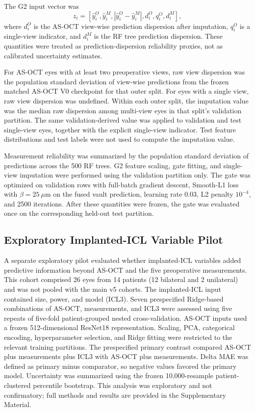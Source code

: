 \documentclass[10pt,twocolumn]{article}
\begin{document}
The G2 input vector was
\begin{equation}
z_i=[
\hat{y}_i^{O},
\hat{y}_i^{M},
|\hat{y}_i^{O}-\hat{y}_i^{M}|,
d_i^{O},
q_i^{O},
d_i^{M}
],
\end{equation}
where $d_i^{O}$ is the AS-OCT view-wise prediction dispersion after imputation, $q_i^{O}$ is a single-view indicator, and $d_i^{M}$ is the RF tree prediction dispersion. These quantities were treated as prediction-dispersion reliability proxies, not as calibrated uncertainty estimates.

For AS-OCT eyes with at least two preoperative views, raw view dispersion was the population standard deviation of view-wise predictions from the frozen matched AS-OCT V0 checkpoint for that outer split. For eyes with a single view, raw view dispersion was undefined. Within each outer split, the imputation value was the median raw dispersion among multi-view eyes in that split's validation partition. The same validation-derived value was applied to validation and test single-view eyes, together with the explicit single-view indicator. Test feature distributions and test labels were not used to compute the imputation value.

Measurement reliability was summarized by the population standard deviation of predictions across the 500 RF trees. G2 feature scaling, gate fitting, and single-view imputation were performed using the validation partition only. The gate was optimized on validation rows with full-batch gradient descent, Smooth-L1 loss with $\beta=25~\mu$m on the fused vault prediction, learning rate 0.03, L2 penalty $10^{-4}$, and 2500 iterations. After these quantities were frozen, the gate was evaluated once on the corresponding held-out test partition.

\subsection{Exploratory Implanted-ICL Variable Pilot}

A separate exploratory pilot evaluated whether implanted-ICL variables added predictive information beyond AS-OCT and the five preoperative measurements. This cohort comprised 26 eyes from 14 patients (12 bilateral and 2 unilateral) and was not pooled with the main v5 cohorts. The implanted-ICL input contained size, power, and model (ICL3). Seven prespecified Ridge-based combinations of AS-OCT, measurements, and ICL3 were assessed using five repeats of five-fold patient-grouped nested cross-validation. AS-OCT inputs used a frozen 512-dimensional ResNet18 representation. Scaling, PCA, categorical encoding, hyperparameter selection, and Ridge fitting were restricted to the relevant training partitions. The prespecified primary contrast compared AS-OCT plus measurements plus ICL3 with AS-OCT plus measurements. Delta MAE was defined as primary minus comparator, so negative values favored the primary model. Uncertainty was summarized using the frozen 10,000-resample patient-clustered percentile bootstrap. This analysis was exploratory and not confirmatory; full methods and results are provided in the Supplementary Material.
\end{document}
